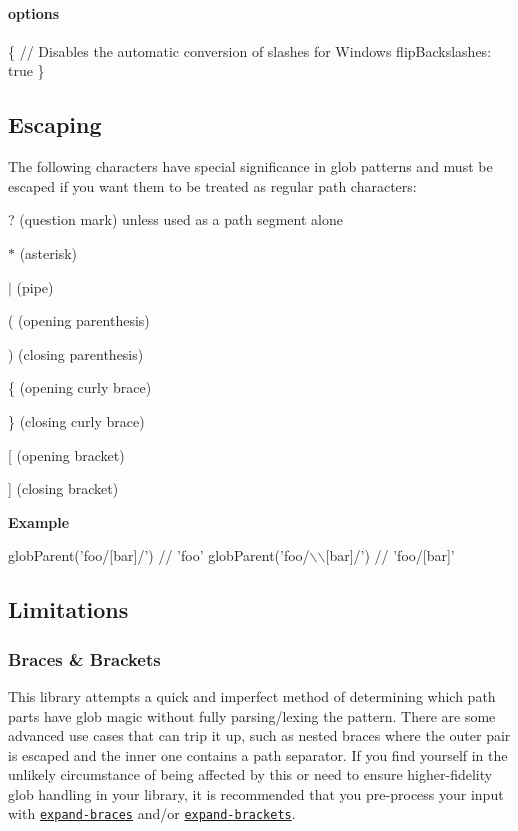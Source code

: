 \paragraph*{options}


\begin{DoxyCode}
\{
  // Disables the automatic conversion of slashes for Windows
  flipBackslashes: true
\}
\end{DoxyCode}


\subsection*{Escaping}

The following characters have special significance in glob patterns and must be escaped if you want them to be treated as regular path characters\+:


\begin{DoxyItemize}
\item {\ttfamily ?} (question mark) unless used as a path segment alone
\item {\ttfamily $\ast$} (asterisk)
\item {\ttfamily $\vert$} (pipe)
\item {\ttfamily (} (opening parenthesis)
\item {\ttfamily )} (closing parenthesis)
\item {\ttfamily \{} (opening curly brace)
\item {\ttfamily \}} (closing curly brace)
\item {\ttfamily \mbox{[}} (opening bracket)
\item {\ttfamily \mbox{]}} (closing bracket)
\end{DoxyItemize}

{\bfseries Example}


\begin{DoxyCode}
globParent('foo/[bar]/') // 'foo'
globParent('foo/\(\backslash\)\(\backslash\)[bar]/') // 'foo/[bar]'
\end{DoxyCode}


\subsection*{Limitations}

\subsubsection*{Braces \& Brackets}

This library attempts a quick and imperfect method of determining which path parts have glob magic without fully parsing/lexing the pattern. There are some advanced use cases that can trip it up, such as nested braces where the outer pair is escaped and the inner one contains a path separator. If you find yourself in the unlikely circumstance of being affected by this or need to ensure higher-\/fidelity glob handling in your library, it is recommended that you pre-\/process your input with \href{https://github.com/jonschlinkert/expand-braces}{\tt expand-\/braces} and/or \href{https://github.com/jonschlinkert/expand-brackets}{\tt expand-\/brackets}.

